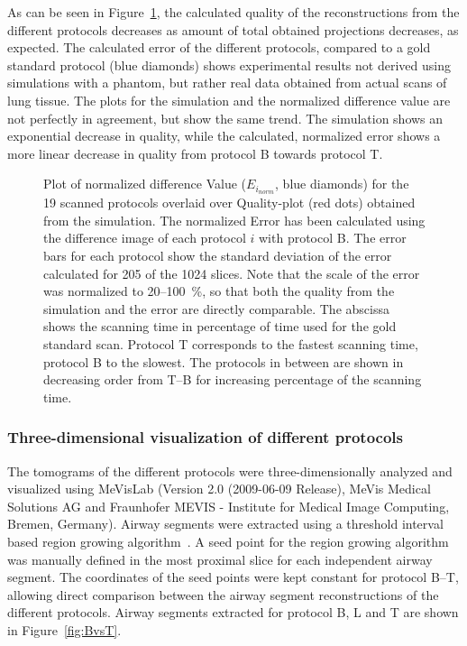 As can be seen in Figure~\ref{fig:NormalizedErrorPlot}, the calculated quality of the reconstructions from the different protocols decreases as amount of total obtained projections decreases, as expected. The calculated error of the different protocols, compared to a gold standard protocol (blue diamonds) shows experimental results not derived using simulations with a phantom, but rather real data obtained from actual scans of lung tissue. The plots for the simulation and the normalized difference value are not perfectly in agreement, but show the same trend. The simulation shows an exponential decrease in quality, while the calculated, normalized error shows a more linear decrease in quality from protocol B towards protocol T.

\begin{figure}
	\centering
	\caption{Plot of normalized difference Value ($E_{i_{norm}}$, blue diamonds) for the 19 scanned protocols overlaid over Quality-plot (red dots) obtained from the simulation. The normalized Error has been calculated using the difference image of each protocol $i$ with protocol B. The error bars for each protocol show the standard deviation of the error calculated for 205 of the 1024 slices. Note that the scale of the error was normalized to 20--\SI{100}{\percent}, so that both the quality from the simulation and the error are directly comparable. The abscissa shows the scanning time in percentage of time used for the gold standard scan. Protocol T corresponds to the fastest scanning time, protocol B to the slowest. The protocols in between are shown in decreasing order from T--B for increasing percentage of the scanning time.}
	\ifiucr		
		
	\else
	\fi
	\label{fig:NormalizedErrorPlot}
\end{figure}

\subsubsection{Three-dimensional visualization of different protocols}
\label{subsec:comparison}
The tomograms of the different protocols were three-dimensionally analyzed and visualized using MeVisLab (Version 2.0 (2009-06-09 Release), MeVis Medical Solutions AG and Fraunhofer MEVIS - Institute for Medical Image Computing, Bremen, Germany). Airway segments were extracted using a threshold interval based region growing algorithm~\cite{Zucker1976}. A seed point for the region growing algorithm was manually defined in the most proximal slice for each independent airway segment. The coordinates of the seed points were kept constant for protocol B--T, allowing direct comparison between the airway segment reconstructions of the different protocols. Airway segments extracted for protocol B, L and T are shown in Figure~\ref{fig:BvsT}.

